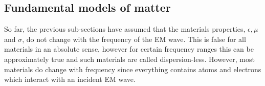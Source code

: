 \subsection{Fundamental models of matter}
So far, the previous sub-sections have assumed that the materials properties, $\epsilon, \mu$ and $\sigma$, do not change with the frequency of the EM wave. This is false for all materials in an absolute sense, however for certain frequency ranges this can be approximately true and such materials are called dispersion-less. However, most materials do change with frequency since everything contains atoms and electrons which interact with an incident EM wave. 

